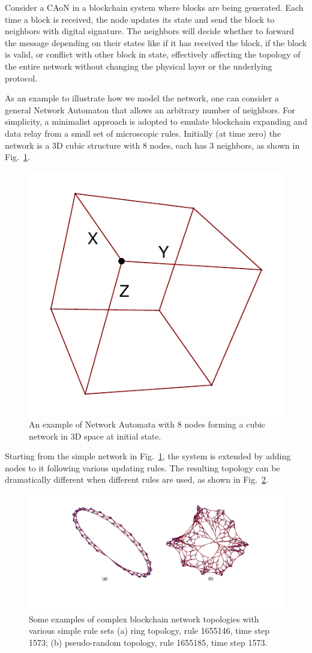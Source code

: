 \documentclass[reprint,pre,aps]{revtex4-1}
\begin{document}
Consider a CAoN in a blockchain system where blocks are being generated. Each time a block is received, the node updates its state and send the block to neighbors with digital signature. The neighbors will decide whether to forward the message depending on their states like if it has received the block, if the block is valid, or conflict with other block in state, effectively affecting the topology of the entire network without changing the physical layer or the underlying protocol.

As an example to illustrate how we model the network, one can consider a general Network Automaton that allows an arbitrary number of neighbors. For simplicity, a minimalist approach is adopted to emulate blockchain expanding and data relay from a small set of microscopic rules. Initially (at time zero) the network is a 3D cubic structure with 8 nodes, each has 3 neighbors, as shown in Fig.~\ref{fig:ca_blockchain_node}.

\begin{figure}[!htp]
\centering
\includegraphics[width=0.5\linewidth]{fig/ca_blockchain_node}
\caption{An example of Network Automata with 8 nodes forming a cubic network in 3D space at initial state.}
\label{fig:ca_blockchain_node}
\end{figure}

Starting from the simple network in Fig.~\ref{fig:ca_blockchain_node}, the system is extended by adding nodes to it following various updating rules. The resulting topology can be dramatically different when different rules are used, as shown in Fig.~\ref{fig:ca_blockchain_topology}.

\begin{figure}[!htp]
\centering
\includegraphics[width=0.9\linewidth]{fig/ca_blockchain_topology}
\caption{Some examples of complex blockchain network topologies with various simple rule sets (a) ring topology, rule 1655146, time step 1573; (b) pseudo-random topology, rule 1655185, time step 1573.}
\label{fig:ca_blockchain_topology}
\end{figure}
\end{document}
